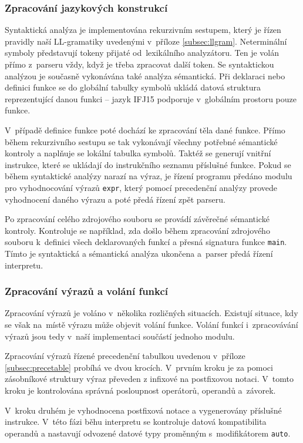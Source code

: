 \documentclass[a4paper, 12pt]{article}
\begin{document}
\subsubsection{Zpracování jazykových konstrukcí}
Syntaktická analýza je implementována rekurzivním sestupem, který je řízen
pravidly naší LL-gramatiky uvedenými v~příloze \ref{subsec:llgram}.
Neterminální symboly představují tokeny přijaté od~lexikálního analyzátoru.
Ten je volán přímo z~parseru vždy, když je třeba
zpracovat další token. Se syntaktickou analýzou je současně vykonávána také
analýza sémantická. Při deklaraci nebo definici funkce se do globální tabulky
symbolů ukládá datová struktura reprezentující danou funkci -- jazyk IFJ15
podporuje v~globálním prostoru pouze funkce.

V~případě definice funkce poté dochází ke zpracování těla dané funkce.
Přímo během rekurzivního sestupu se tak vykonávají všechny potřebné
sémantické kontroly a naplňuje se lokální tabulka symbolů. Taktéž se generují
vnitřní instrukce, které se ukládají do instrukčního seznamu příslušné funkce.
Pokud se během syntaktické analýzy narazí na výraz, je řízení programu předáno
modulu pro vyhodnocování výrazů \texttt{expr}, který pomocí precedenční analýzy
provede vyhodnocení daného výrazu a poté předá řízení zpět parseru.

Po zpracování celého zdrojového souboru se provádí závěrečné sémantické
kontroly. Kontroluje se například, zda došlo během zpracování zdrojového
souboru k~definici všech deklarovaných funkcí a přesná signatura funkce
\texttt{main}. Tímto je syntaktická a sémantická analýza ukončena a~parser předá
řízení interpretu.

\newpage

\subsubsection{Zpracování výrazů a volání funkcí}
Zpracování výrazů je voláno v~několika rozličných situacích. Existují situace,
kdy se však na~místě výrazu může objevit volání funkce. Volání funkcí i~zpracovávání
výrazů jsou tedy v~naší implementaci součástí jednoho modulu.

Zpracování výrazů řízené precedenční tabulkou uvedenou v~příloze
\ref{subsec:precetable} probíhá ve dvou krocích. V~prvním kroku je za pomoci
zásobníkové struktury výraz převeden z infixové
na postfixovou notaci. V~tomto kroku je kontrolována správná posloupnost
operátorů, operandů a~závorek.

V~kroku druhém je vyhodnocena postfixová notace a vygenerovány příslušné 
instrukce. V~této fázi běhu interpretu se kontroluje datová kompatibilita 
operandů a nastavují odvozené datové typy proměnným s~modifikátorem 
\texttt{auto}.
\end{document}
